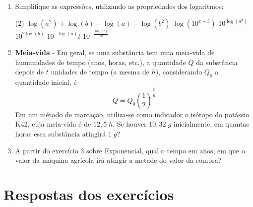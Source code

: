 \begin{enumerate}
		\item Simplifique as expressões, utilizando as propriedades dos logaritmos:
		
		\begin{tasks}(2)
			\task $\log(a^2) + \log(b) - \log(a) - \log(b^2)$
			\task $\log(10^{x+3})$
			\task $10^{\log(a^2)}$
			\task  $10^{2 \log(b)}$
			\task $10^{- \log(a)}t$
			\task $10^{- \frac{\log(t)}{10}}$
		\end{tasks}
		
		\item \textbf{Meia-vida} - Em geral, se uma substância tem uma meia-vida de humanidades de tempo (anos, horas, etc.), a quantidade $Q$ da substância depois de $t$ unidades de tempo ($a$ mesma de $h$), considerando $Q_0$ a quantidade inicial, é
		\[
		Q = Q_0\left(\frac{1}{2}\right)^{\dfrac{t}{h}}
		\]
		Em um método de marcação, utiliza-se como indicador o isótopo do potássio K42, cuja meia-vida é de $12,5 \;h$. Se houver $10,32 \;g$ inicialmente, em quantas horas essa substância atingirá $1 \;g$?
		\item A partir do exercício 3 sobre Exponencial, qual o tempo em anos, em que o valor da máquina agrícola irá atingir a metade do valor da compra?
	\end{enumerate}
	
	\section{Respostas dos exercícios}

